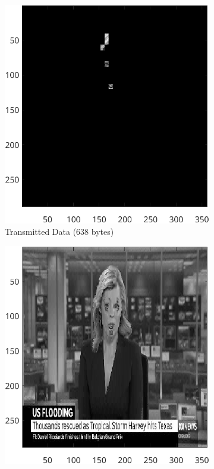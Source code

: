 \documentclass{article}
\begin{document}
\begin{figure}[ht]
\begin{subfigure}[t]{0.45\textwidth}
			\includegraphics[width=\textwidth]{2B_Tolerance50TD}

			\caption{Transmitted Data (638 bytes)}
			\label{fig:2B_Tolerance50TD}

		\end{subfigure}
		\hspace{1cm}
		\begin{subfigure}[t]{0.45\textwidth}
			\centering

			\includegraphics[width=\textwidth]{2B_Tolerance50Reconstructed}


\end{subfigure}
\end{figure}
\end{document}

